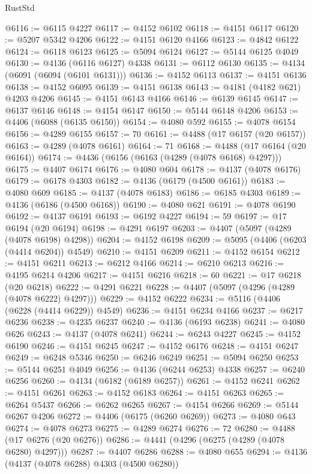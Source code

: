 \begin{lexlean}{RustStd}
\begin{coremodule}
@6116 := @6115 @4227
@6117 := @4152 @6102
@6118 := @4151 @6117
@6120 := @5207 @5342 @4206
@6122 := @4151 @6120 @4166
@6123 := @4842 @6122
@6124 := @6118 @6123
@6125 := @5094 @6124
@6127 := @5144 @6125 @4049
@6130 := @4136 (@6116 @6127) @4338
@6131 := @6112 @6130
@6135 := @4134 (@6091 (@6094 (@6101 @6131)))
@6136 := @4152 @6113
@6137 := @4151 @6136
@6138 := @4152 @6095
@6139 := @4151 @6138
@6143 := @4181 (@4182 @621) @4203 @4206
@6145 := @4151 @6143 @4166
@6146 := @6139 @6145
@6147 := @6137 @6146
@6148 := @4154 @6147
@6150 := @5144 @6148 @4206
@6153 := @4406 (@6088 (@6135 @6150))
@6154 := @4080 @592
@6155 := @4078 @6154
@6156 := @4289 @6155
@6157 := 70
@6161 := @4488 (@17 @6157 (@20 @6157))
@6163 := @4289 (@4078 @6161)
@6164 := 71
@6168 := @4488 (@17 @6164 (@20 @6164))
@6174 := @4436 (@6156 (@6163 (@4289 (@4078 @6168) @4297)))
@6175 := @4407 @6174
@6176 := @4080 @604
@6178 := @4137 (@4078 @6176)
@6179 := @6178 @4303
@6182 := @4136 (@6179 (@4500 @6161))
@6183 := @4080 @609
@6185 := @4137 (@4078 @6183)
@6186 := @6185 @4303
@6189 := @4136 (@6186 (@4500 @6168))
@6190 := @4080 @621
@6191 := @4078 @6190
@6192 := @4137 @6191
@6193 := @6192 @4227
@6194 := 59
@6197 := @17 @6194 (@20 @6194)
@6198 := @4291 @6197
@6203 := @4407 (@5097 (@4289 (@4078 @6198) @4298))
@6204 := @4152 @6198
@6209 := @5095 (@4406 (@6203 (@4414 @6204)) @4549)
@6210 := @4151 @6209
@6211 := @4152 @6154
@6212 := @4151 @6211
@6213 := @6212 @4166
@6214 := @6210 @6213
@6216 := @4195 @6214 @4206
@6217 := @4151 @6216
@6218 := 60
@6221 := @17 @6218 (@20 @6218)
@6222 := @4291 @6221
@6228 := @4407 (@5097 (@4296 (@4289 (@4078 @6222) @4297)))
@6229 := @4152 @6222
@6234 := @5116 (@4406 (@6228 (@4414 @6229)) @4549)
@6236 := @4151 @6234 @4166
@6237 := @6217 @6236
@6238 := @4235 @6237
@6240 := @4136 (@6193 @6238)
@6241 := @4080 @626
@6243 := @4137 (@4078 @6241)
@6244 := @6243 @4227
@6245 := @4152 @6190
@6246 := @4151 @6245
@6247 := @4152 @6176
@6248 := @4151 @6247
@6249 := @6248 @5346
@6250 := @6246 @6249
@6251 := @5094 @6250
@6253 := @5144 @6251 @4049
@6256 := @4136 (@6244 @6253) @4338
@6257 := @6240 @6256
@6260 := @4134 (@6182 (@6189 @6257))
@6261 := @4152 @6241
@6262 := @4151 @6261
@6263 := @4152 @6183
@6264 := @4151 @6263
@6265 := @6264 @5437
@6266 := @6262 @6265
@6267 := @4154 @6266
@6269 := @5144 @6267 @4206
@6272 := @4406 (@6175 (@6260 @6269))
@6273 := @4080 @643
@6274 := @4078 @6273
@6275 := @4289 @6274
@6276 := 72
@6280 := @4488 (@17 @6276 (@20 @6276))
@6286 := @4441 (@4296 (@6275 (@4289 (@4078 @6280) @4297)))
@6287 := @4407 @6286
@6288 := @4080 @655
@6294 := @4136 (@4137 (@4078 @6288) @4303 (@4500 @6280))

\end{coremodule}
\end{lexlean}
